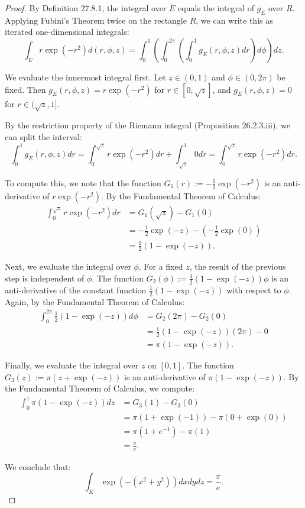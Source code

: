\documentclass[11pt,a4paper]{article}
\theoremstyle{definition}
\theoremstyle{plain}
\theoremstyle{remark}
\begin{document}
\begin{proof}
By Definition 27.8.1, the integral over $E$ equals the integral of $g_E$ over $R$. Applying Fubini's Theorem twice on the rectangle $R$, we can write this as iterated one-dimensional integrals:
\[ \int_E r \exp(-r^2) d(r,\phi,z) = \int_0^1 \left( \int_0^{2\pi} \left( \int_0^1 g_E(r, \phi, z) dr \right) d\phi \right) dz. \]

We evaluate the innermost integral first. Let $z \in (0, 1)$ and $\phi \in (0, 2\pi)$ be fixed. Then $g_E(r, \phi, z) = r \exp(-r^2)$ for $r \in [0, \sqrt{z}]$, and $g_E(r, \phi, z) = 0$ for $r \in (\sqrt{z}, 1]$. 

By the restriction property of the Riemann integral (Proposition 26.2.3.iii), we can split the interval:
\[ \int_0^1 g_E(r, \phi, z) dr = \int_0^{\sqrt{z}} r \exp(-r^2) dr + \int_{\sqrt{z}}^1 0 dr = \int_0^{\sqrt{z}} r \exp(-r^2) dr. \]

To compute this, we note that the function $G_1(r) := -\frac{1}{2} \exp(-r^2)$ is an anti-derivative of $r \exp(-r^2)$. 
By the Fundamental Theorem of Calculus:
\begin{align*}
\int_0^{\sqrt{z}} r \exp(-r^2) dr &= G_1(\sqrt{z}) - G_1(0) \\
&= -\frac{1}{2}\exp(-z) - \left(-\frac{1}{2}\exp(0)\right) \\
&= \frac{1}{2}(1 - \exp(-z)).
\end{align*}

Next, we evaluate the integral over $\phi$. For a fixed $z$, the result of the previous step is independent of $\phi$. The function $G_2(\phi) := \frac{1}{2}(1 - \exp(-z))\phi$ is an anti-derivative of the constant function $\frac{1}{2}(1 - \exp(-z))$ with respect to $\phi$. 
Again, by the Fundamental Theorem of Calculus:
\begin{align*} 
\int_0^{2\pi} \frac{1}{2}(1 - \exp(-z)) d\phi &= G_2(2\pi) - G_2(0) \\
&= \frac{1}{2}(1 - \exp(-z))(2\pi) - 0 \\
&= \pi(1 - \exp(-z)). 
\end{align*}

Finally, we evaluate the integral over $z$ on $[0, 1]$. The function $G_3(z) := \pi(z + \exp(-z))$ is an anti-derivative of $\pi(1 - \exp(-z))$. 
By the Fundamental Theorem of Calculus, we compute:
\begin{align*}
\int_0^1 \pi(1 - \exp(-z)) dz &= G_3(1) - G_3(0) \\
&= \pi(1 + \exp(-1)) - \pi(0 + \exp(0)) \\
&= \pi(1 + e^{-1}) - \pi(1) \\
&= \frac{\pi}{e}.
\end{align*}

We conclude that:
\[ \int_K \exp(-(x^2 + y^2)) dxdydz = \frac{\pi}{e}. \]
\end{proof}
\end{document}
